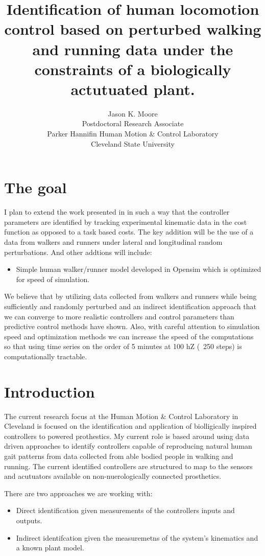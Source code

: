 \documentclass[11pt]{article}
\title{Identification of human locomotion control based on perturbed walking
and running data under the constraints of a biologically actutuated plant.}
\author{Jason K. Moore\\
  Postdoctoral Research Associate\\
  Parker Hannifin Human Motion \& Control Laboratory\\
  Cleveland State University
}
\begin{document}
\maketitle

\section{The goal}

I plan to extend the work presented in \cite{Wang2012} in such a way that the
controller parameters are identified by tracking experimental kinematic data in
the cost function as opposed to a task based costs. The key addition will be
the use of a data from walkers and runners under lateral and longitudinal
random perturbations. And other addtions will include:

\begin{itemize}
  \item Simple human walker/runner model developed in Opensim which is
    optimized for speed of simulation.
\end{itemize}

We believe that by utilizing data collected from walkers and runners while
being sufficiently and randomly perturbed and an indirect identification
approach that we can converge to more realistic controllers and control
parameters than predictive control methods have shown. Also, with careful
attention to simulation speed and optimization methods we can increase the
speed of the computations so that using time series on the order of 5 minutes
at 100 hZ (~250 steps) is computationally tractable.

\section{Introduction}

The current research focus at the Human Motion \& Control Laboratory in
Cleveland is focused on the identification and application of biolligically
inspired controllers to powered prothestics. My current role is based around
using data driven approaches to identify controllers capable of reproducing
natural human gait patterns from data collected from able bodied people in
walking and running. The current identified controllers are structured to map
to the sensors and acutuators available on non-nuerologically connected
prosthetics.

There are two approaches we are working with:

\begin{itemize}
  \item Direct identification given measurements of the controllers inputs and
    outputs.
  \item Indirect identifcation given the measuremetns of the system's
    kinematics and a known plant model.
\end{itemize}
\end{document}
